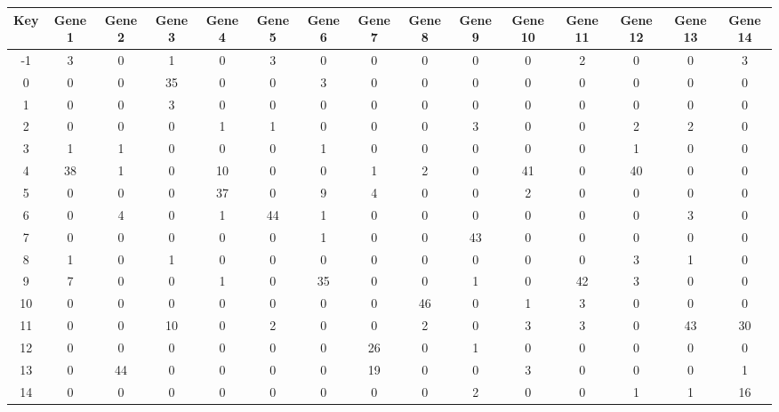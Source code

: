 \begin{tabular}{|c|c|c|c|c|c|c|c|c|c|c|c|c|c|c|}
\hline
Key & Gene 1 & Gene 2 & Gene 3 & Gene 4 & Gene 5 & Gene 6 & Gene 7 & Gene 8 & Gene 9 & Gene 10 & Gene 11 & Gene 12 & Gene 13 & Gene 14 \\
\hline
-1 & 3 & 0 & 1 & 0 & 3 & 0 & 0 & 0 & 0 & 0 & 2 & 0 & 0 & 3 \\
0 & 0 & 0 & 35 & 0 & 0 & 3 & 0 & 0 & 0 & 0 & 0 & 0 & 0 & 0 \\
1 & 0 & 0 & 3 & 0 & 0 & 0 & 0 & 0 & 0 & 0 & 0 & 0 & 0 & 0 \\
2 & 0 & 0 & 0 & 1 & 1 & 0 & 0 & 0 & 3 & 0 & 0 & 2 & 2 & 0 \\
3 & 1 & 1 & 0 & 0 & 0 & 1 & 0 & 0 & 0 & 0 & 0 & 1 & 0 & 0 \\
4 & 38 & 1 & 0 & 10 & 0 & 0 & 1 & 2 & 0 & 41 & 0 & 40 & 0 & 0 \\
5 & 0 & 0 & 0 & 37 & 0 & 9 & 4 & 0 & 0 & 2 & 0 & 0 & 0 & 0 \\
6 & 0 & 4 & 0 & 1 & 44 & 1 & 0 & 0 & 0 & 0 & 0 & 0 & 3 & 0 \\
7 & 0 & 0 & 0 & 0 & 0 & 1 & 0 & 0 & 43 & 0 & 0 & 0 & 0 & 0 \\
8 & 1 & 0 & 1 & 0 & 0 & 0 & 0 & 0 & 0 & 0 & 0 & 3 & 1 & 0 \\
9 & 7 & 0 & 0 & 1 & 0 & 35 & 0 & 0 & 1 & 0 & 42 & 3 & 0 & 0 \\
10 & 0 & 0 & 0 & 0 & 0 & 0 & 0 & 46 & 0 & 1 & 3 & 0 & 0 & 0 \\
11 & 0 & 0 & 10 & 0 & 2 & 0 & 0 & 2 & 0 & 3 & 3 & 0 & 43 & 30 \\
12 & 0 & 0 & 0 & 0 & 0 & 0 & 26 & 0 & 1 & 0 & 0 & 0 & 0 & 0 \\
13 & 0 & 44 & 0 & 0 & 0 & 0 & 19 & 0 & 0 & 3 & 0 & 0 & 0 & 1 \\
14 & 0 & 0 & 0 & 0 & 0 & 0 & 0 & 0 & 2 & 0 & 0 & 1 & 1 & 16 \\
\hline
\end{tabular}